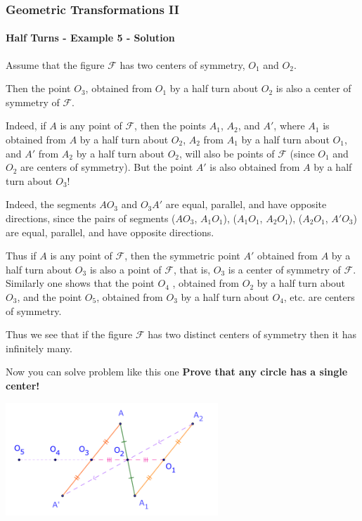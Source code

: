 \documentclass[8pt,xcolor=table,dvipsnames]{beamer}
\begin{document}
\begin{frame}[t]
    \frametitle{Geometric Transformations II}
    \framesubtitle{Half Turns - Example 5 - Solution}
    \begin{overprint}
        Assume that the figure $\mathcal{F}$ has two centers of symmetry, $O_1$ and $O_2$.

        \bigbreak
        Then the point $O_3$, obtained from $O_1$ by a half turn about $O_2$ is also a center of symmetry of $\mathcal{F}$.

        \bigbreak
        Indeed, if $A$ is any point of $\mathcal{F}$, then the points $A_1$, $A_2$, and $A'$, where $A_1$ is obtained from $A$ by a half turn about $O_2$,
        $A_2$ from $A_1$ by a half turn about $O_1$, and $A'$ from $A_2$ by a half turn about $O_2$, will also be points of $\mathcal{F}$
        (since $O_1$ and $O_2$ are centers of symmetry).
        But the point $A'$ is also obtained from $A$ by a half turn about $O_3$!

        \bigbreak
        Indeed, the segments $AO_3$ and $O_3A'$ are equal, parallel, and have opposite directions,
        since the pairs of segments ($AO_3$, $A_1O_1$), ($A_1O_1$, $A_2O_1$), ($A_2O_1$, $A'O_3$) are equal, parallel, and have opposite directions.
    
        \bigbreak
        Thus if $A$ is any point of $\mathcal{F}$, then the symmetric point $A'$ obtained from $A$ by a half turn about $O_3$ is also a point of $\mathcal{F}$,
        that is, $O_3$ is a center of symmetry of $\mathcal{F}$.
        Similarly one shows that the point $O_4$ , obtained from $O_2$ by a half turn about $O_3$, and the point $O_5$,
        obtained from $O_3$ by a half turn about $O_4$, etc. are centers of symmetry. 
        
        \bigbreak
        Thus we see that if the figure $\mathcal{F}$ has two distinct centers of symmetry then it has infinitely many.

        \bigbreak
        Now you can solve problem like this one \textbf{Prove that any circle has a single center!}
    \end{overprint}
    \begin{center}
        \includegraphics[width=8cm]{./svg/pdf/rotation-9b.pdf}
    \end{center}
\end{frame}
\end{document}
